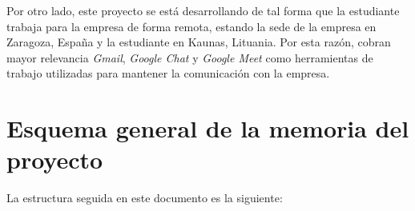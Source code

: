 Por otro lado, este proyecto se está desarrollando de tal forma que la estudiante trabaja para la empresa de forma remota, estando la sede de la empresa en Zaragoza, España y la estudiante en Kaunas, Lituania. Por esta razón, cobran mayor relevancia \textit{Gmail}, \textit{Google Chat} y \textit{Google Meet} como herramientas de trabajo utilizadas para mantener la comunicación con la empresa.

\section{Esquema general de la memoria del proyecto}


La estructura seguida en este documento es la siguiente:


